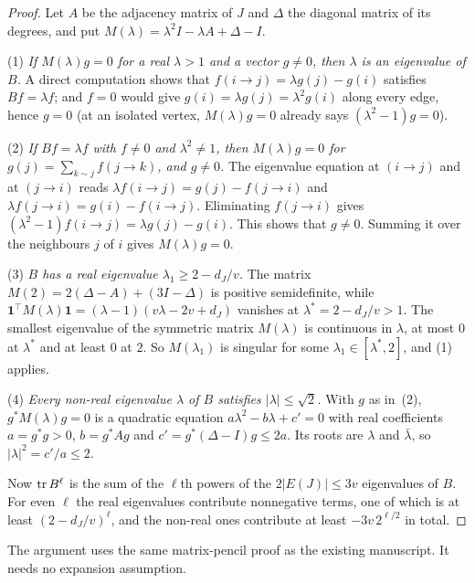 \begin{proof}
Let $A$ be the adjacency matrix of $J$ and $\Delta$ the diagonal matrix of its degrees, and put
$M(\lambda)=\lambda^{2}I-\lambda A+\Delta-I$.

(1) \emph{If $M(\lambda)g=0$ for a real $\lambda>1$ and a vector $g\ne0$, then $\lambda$ is an
eigenvalue of $B$.} A direct computation shows that $f(i\to j)=\lambda g(j)-g(i)$ satisfies
$Bf=\lambda f$; and $f=0$ would give $g(i)=\lambda g(j)=\lambda^{2}g(i)$ along every edge, hence
$g=0$ (at an isolated vertex, $M(\lambda)g=0$ already says $(\lambda^{2}-1)g=0$).

(2) \emph{If $Bf=\lambda f$ with $f\ne0$ and $\lambda^{2}\ne1$, then $M(\lambda)g=0$ for
$g(j)=\sum_{k\sim j}f(j\to k)$, and $g\ne0$.} The eigenvalue equation at $(i\to j)$ and at
$(j\to i)$ reads $\lambda f(i\to j)=g(j)-f(j\to i)$ and $\lambda f(j\to i)=g(i)-f(i\to j)$.
Eliminating $f(j\to i)$ gives $(\lambda^{2}-1)f(i\to j)=\lambda g(j)-g(i)$. This shows that
$g\ne0$. Summing it over the neighbours $j$ of $i$ gives $M(\lambda)g=0$.

(3) \emph{$B$ has a real eigenvalue $\lambda_1\ge2-d_J/v$.} The matrix
$M(2)=2(\Delta-A)+(3I-\Delta)$ is positive semidefinite, while
$\mathbf{1}^{\!\top}M(\lambda)\mathbf{1}=(\lambda-1)(v\lambda-2v+d_J)$ vanishes at
$\lambda^{*}=2-d_J/v>1$. The smallest eigenvalue of the symmetric matrix $M(\lambda)$ is continuous
in $\lambda$, at most $0$ at $\lambda^{*}$ and at least $0$ at $2$. So $M(\lambda_1)$ is singular for
some $\lambda_1\in[\lambda^{*},2]$, and (1) applies.

(4) \emph{Every non-real eigenvalue $\lambda$ of $B$ satisfies $|\lambda|\le\sqrt2$.} With $g$ as
in~(2), $g^{*}M(\lambda)g=0$ is a quadratic equation $a\lambda^{2}-b\lambda+c'=0$ with real
coefficients $a=g^{*}g>0$, $b=g^{*}Ag$ and $c'=g^{*}(\Delta-I)g\le2a$. Its roots are $\lambda$ and
$\bar\lambda$, so $|\lambda|^{2}=c'/a\le2$.

Now $\operatorname{tr} B^{\ell}$ is the sum of the $\ell$th powers of the $2|E(J)|\le3v$ eigenvalues of $B$. For
even $\ell$ the real eigenvalues contribute nonnegative terms, one of which is at least
$(2-d_J/v)^{\ell}$, and the non-real ones contribute at least $-3v\,2^{\ell/2}$ in total.
\end{proof}

The argument uses the same matrix-pencil proof as the existing manuscript.
It needs no expansion assumption.


